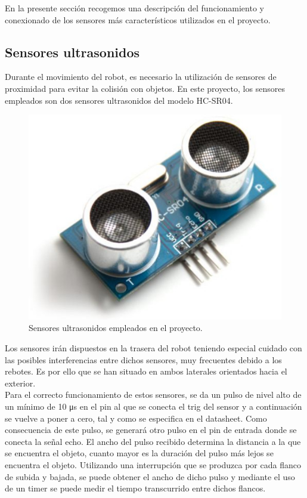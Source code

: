 En la presente sección recogemos una descripción del funcionamiento y conexionado de los sensores más característicos utilizados en el proyecto.\\

\subsection{Sensores ultrasonidos}
\label{sec:ultrasonido}

Durante el movimiento del robot, es necesario la utilización de sensores de proximidad para
evitar la colisión con objetos. En este proyecto, los sensores empleados son dos sensores
ultrasonidos del modelo HC-SR04.\\

\begin{figure}[H]
  \begin{center}
    \includegraphics[scale=0.4]{imagenes/ultrasonido.jpg}
  \end{center}
  \caption{Sensores ultrasonidos empleados en el proyecto.}
  \label{figura:rpi-modulo-bateria}
\end{figure}

Los sensores irán dispuestos en la trasera del robot teniendo especial cuidado con las posibles interferencias entre dichos sensores, muy frecuentes debido a los rebotes. Es por ello
que se han situado en ambos laterales orientados hacia el exterior.\\

Para el correcto funcionamiento de estos sensores, se da un pulso de nivel alto de un mínimo de
10 μs en el pin al que se conecta el trig del sensor y a continuación se vuelve a poner a cero, tal y
como se especifica en el datasheet. Como consecuencia de este pulso, se generará otro pulso en
el pin de entrada donde se conecta la señal echo. El ancho del pulso recibido determina la
distancia a la que se encuentra el objeto, cuanto mayor es la duración del pulso más lejos se
encuentra el objeto. Utilizando una interrupción que se produzca por cada flanco de subida y
bajada, se puede obtener el ancho de dicho pulso y mediante el uso de un timer se puede medir el
tiempo transcurrido entre dichos flancos.\\


